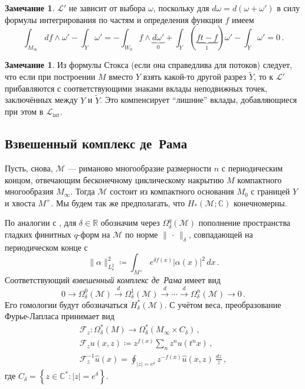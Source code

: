 \documentclass[a4paper, 12pt]{article}
\theoremstyle{definition}
\newtheorem{remark}[theorem]{Замечание}
\begin{document}
\begin{remark}
    \({ \mathcal L' }\) не зависит от выбора \({ \omega }\), поскольку для \({ d\omega = d(\omega + \omega') }\) в силу формулы интегрирования по частям и определения функции \({ f }\) имеем \[
        \int_{M_{\infty}} df \land \omega' - \int_{Y} \omega' = -\int_{W_0} f \land \underbrace{d\omega'}_{0} + \int_{Y} (\underbrace{ft - f}_{1}) \omega' - \int_{Y} \omega' = 0\,.
    \]
\end{remark}

\begin{remark}
    Из формулы Стокса (если она справедлива для потоков) следует, что если при построении \({ M }\) вместо \({ Y }\) взять какой-то другой разрез \({ \widetilde Y }\), то к \({ \mathcal L' }\) прибавляются с соответствующими знаками вклады неподвижных точек, заключённых между \({ Y }\) и \({ \widetilde Y }\). Это компенсирует ``лишние'' вклады, добавляющиеся при этом в \({ \mathcal L_{\operatorname{int}} }\).
\end{remark}

\subsection{Взвешенный комплекс де~Рама}

Пусть, снова, \({ \mathcal M }\) --- риманово многообразие размерности \({ n }\) с периодическим концом, отвечающим бесконечному циклическому накрытию \({ M }\) компактного многообразия \({ M_{\infty} }\). Тогда \({ \mathcal M }\) состоит из компактного основания \({ M_0 }\) с границей \({ Y }\) и хвоста \({ M^{+} }\). Мы будем так же предполагать, что \({ H_{*}(\mathcal M; \mathbb C) }\) конечномерны.

По аналогии с \cite{mrowka2015index}, для $\delta \in \mathbb R$ обозначим через $\Omega_{\delta}^q(\mathcal M)$ пополнение пространства гладких финитных $q$-форм на $\mathcal M$ по норме \({ \lVert \,\cdot\, \rVert_{\delta} }\), совпадающей на периодическом конце с
\[
    \|\alpha\|_{L^2_{\delta}}^2 \coloneqq \int_{M^{+}} e^{\delta f(x)} |\alpha(x)|^2\, dx\,.
\]
Соответствующий \emph{взвешенный комплекс де~Рама} имеет вид
\begin{equation}
    \label{eq:weighted_de_rham_complex}
    0 \to \Omega_{\delta}^0(\mathcal M)
    \overset{d}{\longrightarrow} \Omega_{\delta}^1(\mathcal M)
    \overset{d}{\longrightarrow} \cdots
    \overset{d}{\longrightarrow} \Omega_{\delta}^n(\mathcal M)
    \to 0\,.
\end{equation}
Его гомологии будут обозначаться \({ H^{*}_{\delta}(\mathcal M) }\).
С учётом веса, преобразование Фурье-Лапласа принимает вид \[
    \begin{gathered}
        \mathcal F_{z} : \Omega_{\delta}^{*}(M) \to \Omega_{\delta}^{*}(M_{\infty} \times C_{\delta})\,, \\
        \mathcal F_{z}u(x, z) \coloneqq z^{f(x)} \sum_{n} z^{n} u(t^{n} x)\,, \\
        \mathcal F_{z}^{-1} \hat{u}(x) = \oint_{\lvert z \rvert = e^{\delta}} z^{-f(x)} \hat{u}(x, z)\: \frac{dz}{z}\,,
    \end{gathered}
\] где \({ C_{\delta} = \left\{ z \in \mathbb C^{*} : \lvert z \rvert = e^{\delta} \right\} }\).
\end{document}
